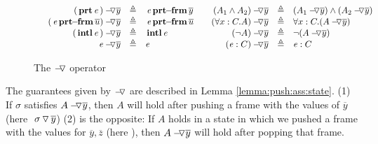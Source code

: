 {{\begin{figure}[hbt]
$
\begin{array}{c}
\begin{array}{l}
\begin{array}{rclcrcl}
  \PushAS y {(\inside \re)} & \triangleq &  \protectedFrom \re {\overline {y} }
  & &
  \PushAS y   {(A_1  \wedge  A_2)} & \triangleq &  (\PushAS y  { A_1})  \wedge  ( \PushAS y  {A_2} )  
\\ 
 \PushAS y {(\protectedFrom \re {\overline {u}})} &  \triangleq& \protectedFrom \re {\overline {u}} 
  & &
 \PushAS y  {(\forall x:C.A)} & \triangleq & \forall x:C.({\PushAS y A} )  
  \\  
  \PushAS y  {(\internal \re)} &  \triangleq & {\internal \re}  %
  & & 
  \PushAS y  {(\neg A)} &  \triangleq & \neg( {\PushAS y A} )  
    \\
     \PushAS y  {\re} &  \triangleq&   \re %
    & &
    \PushAS y  {(\re:C)} &  \triangleq&   \re:C 
 \end{array}
\end{array}
\end{array}
$
\caption{The $\pushSymbolAA$  operator  } 
\label{f:Push}
\end{figure}


\newcommand{\sigmas}{\widetilde \sigma}



\vspace{.1cm}

The guarantees given by $\pushSymbolAA$ are described in Lemma \ref{lemma:push:ass:state}. (1) If  %
$\sigma$ satisfies  $\PushAS y A$, then   $A$ will hold after pushing a frame with the values of $\overline y$ (here $\PushS {y} {\sigma}$)
(2) is the opposite: If $A$ holds in a state in which we pushed a frame with the values for $\overline y, \overline z$ 
(here  \sigma), then $\PushAS {y} {A}$ will hold  after popping that frame.

}}
